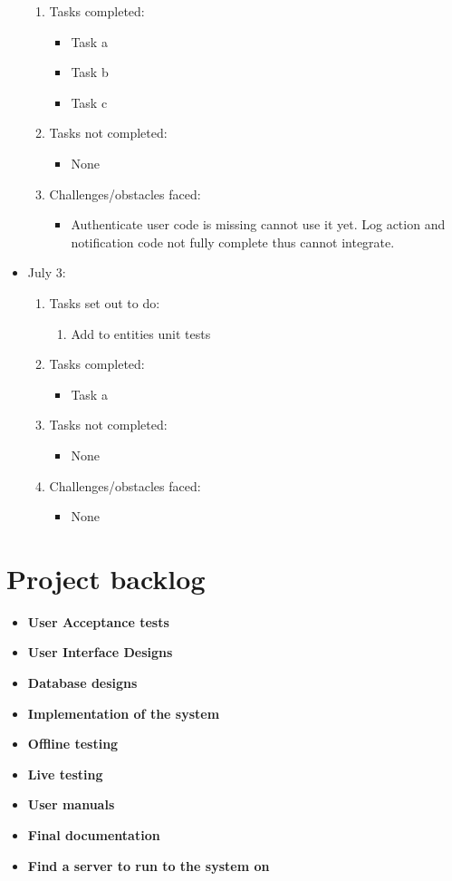 \documentclass[12pt]{article}
\begin{document}
\begin{itemize}
\begin{enumerate}
		\item Tasks completed:
		\begin{itemize}
			\item Task a
			\item Task b
			\item Task c								
		\end{itemize}
		\item Tasks not completed:
		\begin{itemize}
			\item None
		\end{itemize}
		\item Challenges/obstacles faced:
		\begin{itemize}
			\item Authenticate user code is missing cannot use it yet. Log action and notification code not fully complete thus cannot integrate.
		\end{itemize}			
	\end{enumerate}
	\item July 3:
	\begin{enumerate}
		\item Tasks set out to do:
		\begin{enumerate}
			\item Add to entities unit tests			
		\end{enumerate}
		\item Tasks completed:
		\begin{itemize}
			\item Task a								
		\end{itemize}
		\item Tasks not completed:
		\begin{itemize}
			\item None
		\end{itemize}
		\item Challenges/obstacles faced:
		\begin{itemize}
			\item None
		\end{itemize}			
	\end{enumerate}
\end{itemize}

\section{Project backlog}

\begin{itemize}
\item \textbf{User Acceptance tests}
\item \textbf{User Interface Designs}
\item \textbf{Database designs}
\item \textbf{Implementation of the system}
\item \textbf{Offline testing}
\item \textbf{Live testing}
\item \textbf{User manuals}
\item \textbf{Final documentation}
\item \textbf{Find a server to run to the system on}


\end{itemize}
\end{document}
